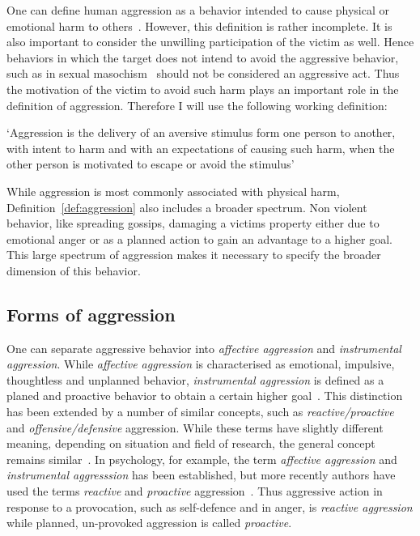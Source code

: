 \documentclass[../header.tex]{subfiles}
\begin{document}
One can define human aggression as a behavior intended to cause physical or emotional harm to others~\cite{Anderson2002}.
However, this definition is rather incomplete.
It is also important to consider the unwilling participation of the victim as well.
Hence behaviors in which the target does not intend to avoid the aggressive behavior, such as in sexual masochism~\cite{Berkowitz1993,Baumeister1989,Baron2007,Geen2001} should not be considered an aggressive act.
Thus the motivation of the victim to avoid such harm plays an important role in the definition of aggression.  
Therefore I will use the following working definition:
\begin{mydef}[Aggression]\label{def:aggression}
	`Aggression is the delivery of an aversive stimulus form one person to another, with intent to harm and with an expectations of causing such harm, when the other person is motivated to escape or avoid the stimulus'~\cite{Geen2001}
\end{mydef}

While aggression is most commonly associated with physical harm, Definition~\ref{def:aggression} also includes a broader spectrum.
Non violent behavior, like spreading gossips, damaging a victims property either due to emotional anger or as a planned action to gain an advantage to a higher goal.
This large spectrum of aggression makes it necessary to specify the broader dimension of this behavior.

\subsection{Forms of aggression}
\label{sub:forms_of_aggression}

One can separate aggressive behavior into \textit{affective aggression} and \textit{instrumental aggression}.
While \textit{affective aggression} is characterised as emotional, impulsive, thoughtless and unplanned behavior, \textit{instrumental aggression} is defined as a planed and proactive behavior to obtain a certain higher goal~\cite{Berkowitz1993,Geen2001}.
This distinction has been extended by a number of similar concepts, such as \textit{reactive/proactive} and \textit{offensive/defensive} aggression.
While these terms have slightly different meaning, depending on situation and field of research, the general concept remains similar~\cite{Geen2001, Blanchard2005b}.
In psychology, for example, the term \textit{affective aggression} and \textit{instrumental aggresssion} has been established, but more recently authors have used the terms \textit{reactive} and \textit{proactive} aggression~\cite{Geen2001}.
Thus aggressive action in response to a provocation, such as self-defence and in anger, is \textit{reactive aggression} while planned, un-provoked aggression is called \textit{proactive}.
\end{document}
